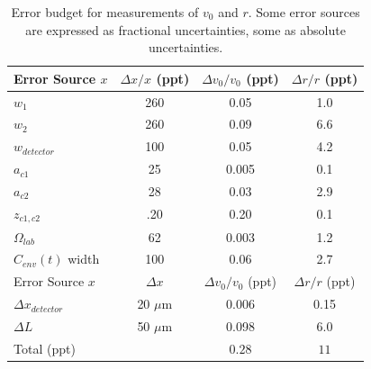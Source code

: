 \documentclass[twocolumn, prl,showpacs,superscriptaddress]{revtex4-1}   %
\newcommand{\sigv}{0.28}
\newcommand{\sigr}{11}
\begin{document}
\begingroup
\begin{table}
\caption{\label{velPolError}Error budget for measurements of $v_0$ and $r$. Some error sources are expressed as fractional uncertainties, some as absolute uncertainties.}
\begin{center}
\begin{tabular}{l c c c}
\hline\hline
Error Source $x$ & $\Delta x/x$ (ppt) & $\Delta v_0/v_0$ (ppt) & $\Delta r/r$ (ppt) \\
\hline
$w_1$ & 260 & 0.05 & 1.0 \\
$w_2$ & 260 & 0.09 & 6.6 \\
$w_{detector}$ & 100 & 0.05 & 4.2 \\
$a_{c1}$ & 25 & 0.005 & 0.1 \\
$a_{c2}$ & 28 & 0.03 & 2.9 \\
$z_{c1,c2}$ & .20 & 0.20 & 0.1 \\
$\Omega_{lab}$ & 62 & 0.003 & 1.2 \\
$C_{env}(t)$ width & 100 & 0.06 & 2.7 \\
\hline
Error Source $x$ & $\Delta x$ & $\Delta v_0/v_0$ (ppt) & $\Delta r/r$ (ppt) \\
\hline
$\Delta x_{detector}$ & 20 $\mu$m & 0.006 & 0.15 \\
$\Delta L$ & 50 $\mu$m & 0.098 & 6.0 \\
\hline
Total (ppt) & & $\sigv$ & $\sigr$ \\
\hline\hline
\end{tabular}
\end{center}
\end{table}
\endgroup
\end{document}
